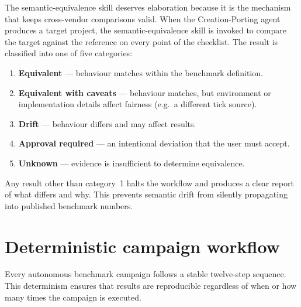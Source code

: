 The semantic-equivalence skill deserves elaboration because it is the mechanism that keeps
cross-vendor comparisons valid. When the Creation-Porting agent produces a target project,
the semantic-equivalence skill is invoked to compare the target against the reference on
every point of the checklist. The result is classified into one of five categories:

\begin{enumerate}
\item \textbf{Equivalent} --- behaviour matches within the benchmark definition.
\item \textbf{Equivalent with caveats} --- behaviour matches, but environment or
implementation details affect fairness (e.g.\ a different tick source).
\item \textbf{Drift} --- behaviour differs and may affect results.
\item \textbf{Approval required} --- an intentional deviation that the user must accept.
\item \textbf{Unknown} --- evidence is insufficient to determine equivalence.
\end{enumerate}

Any result other than category~1 halts the workflow and produces a clear report of what
differs and why. This prevents semantic drift from silently propagating into published
benchmark numbers.

\section{Deterministic campaign workflow}
\label{sec:agent-workflow}

Every autonomous benchmark campaign follows a stable twelve-step sequence. This
determinism ensures that results are reproducible regardless of when or how many times the
campaign is executed.

